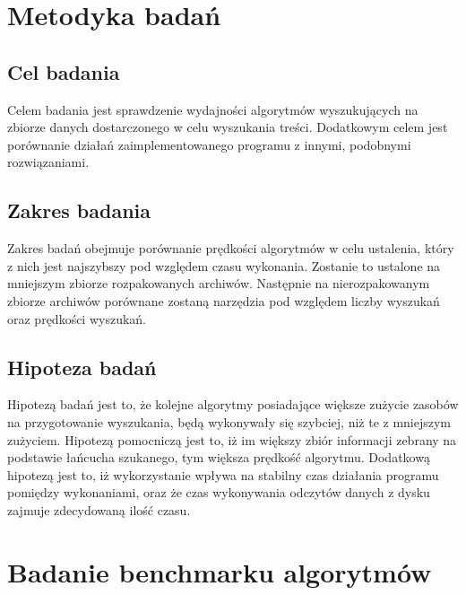 \section{Metodyka badań}

\subsection{Cel badania}

Celem badania jest sprawdzenie wydajności algorytmów wyszukujących na zbiorze
danych dostarczonego w celu wyszukania treści. Dodatkowym celem jest porównanie
działań zaimplementowanego programu z innymi, podobnymi rozwiązaniami.

\subsection{Zakres badania}

Zakres badań obejmuje porównanie prędkości algorytmów w celu ustalenia, który
z nich jest najszybszy pod względem czasu wykonania. Zostanie to ustalone na
mniejszym zbiorze rozpakowanych archiwów. Następnie na nierozpakowanym zbiorze
archiwów porównane zostaną narzędzia pod względem liczby wyszukań oraz prędkości
wyszukań.

\subsection{Hipoteza badań}

Hipotezą badań jest to, że kolejne algorytmy posiadające większe zużycie zasobów
na przygotowanie wyszukania, będą wykonywały się szybciej, niż te z mniejszym
zużyciem. Hipotezą pomocniczą jest to, iż im większy zbiór informacji zebrany
na podstawie łańcucha szukanego, tym większa prędkość algorytmu. Dodatkową hipotezą jest
to, iż wykorzystanie  wpływa na stabilny czas
działania programu pomiędzy wykonaniami, oraz że czas wykonywania odczytów danych z dysku zajmuje
zdecydowaną ilość czasu.

\section{Badanie benchmarku algorytmów}

